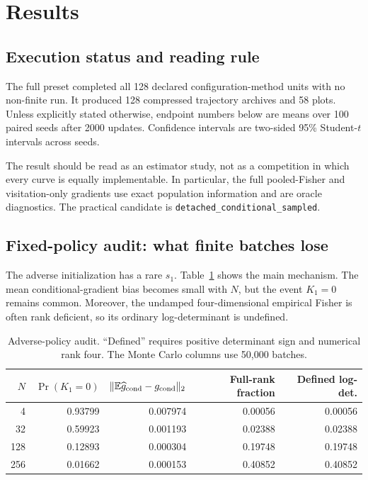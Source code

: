 \documentclass[10pt,a4paper]{article}
\begin{document}
\section{Results}
\subsection{Execution status and reading rule}
The full preset completed all 128 declared configuration-method units with no
non-finite run. It produced 128 compressed trajectory archives and 58 plots.
Unless explicitly stated otherwise, endpoint numbers below are means over 100
paired seeds after 2000 updates. Confidence intervals are two-sided 95\%
Student-$t$ intervals across seeds.

The result should be read as an estimator study, not as a competition in which
every curve is equally implementable. In particular, the full pooled-Fisher
and visitation-only gradients use exact population information and are oracle
diagnostics. The practical candidate is
\texttt{detached\_conditional\_sampled}.

\subsection{Fixed-policy audit: what finite batches lose}
The adverse initialization has a rare $s_1$. Table~\ref{tab:audit} shows the
main mechanism. The mean conditional-gradient bias becomes small with $N$,
but the event $K_1=0$ remains common. Moreover, the undamped four-dimensional
empirical Fisher is often rank deficient, so its ordinary log-determinant is
undefined.

\begin{table}[htbp]
\centering\small
\caption{Adverse-policy audit. ``Defined'' requires positive determinant sign
and numerical rank four. The Monte Carlo columns use 50,000 batches.}
\label{tab:audit}
\begin{tabular}{rrrrr}
\toprule
$N$ & $\Pr(K_1=0)$ & $\|\mathbb E\widehat g_{\rm cond}-g_{\rm cond}\|_2$
& Full-rank fraction & Defined log-det. \\
\midrule
4   & 0.93799 & 0.007974 & 0.00056 & 0.00056 \\
32  & 0.59923 & 0.001193 & 0.02388 & 0.02388 \\
128 & 0.12893 & 0.000304 & 0.19748 & 0.19748 \\
256 & 0.01662 & 0.000153 & 0.40852 & 0.40852 \\
\bottomrule
\end{tabular}
\end{table}
\end{document}
